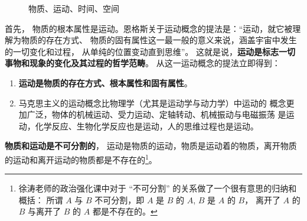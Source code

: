 \documentclass[10pt, UTF8]{book} %
\begin{document}
\begin{figure}[H]
\caption{物质、运动、时间、空间}
\end{figure}

首先，
物质的根本属性是运动。恩格斯关于运动概念的提法是：“运动，就它被理解为物质的存在方式、
物质的固有属性这一最一般的意义来说，涵盖宇宙中发生的一切变化和过程，
从单纯的位置变动直到思维”。
这就是说，\textbf{运动是标志一切事物和现象的变化及其过程的哲学范畴}。
从这一运动概念的提法立即得到：
\begin{enumerate}[label={${\arabic*}^\circ$}, itemsep=0pt]
    \item \textbf{运动是物质的存在方式、根本属性和固有属性}。
    \item 马克思主义的运动概念比物理学（尤其是运动学与动力学）中运动的
    概念更加广泛，物体的机械运动、受力运动、定轴转动、机械振动与电磁振荡
    是运动，化学反应、生物化学反应也是运动，人的思维过程也是运动。
\end{enumerate}
\textbf{物质和运动是不可分割的}，
运动是物质的运动，物质是运动着的物质，离开物质的运动和离开运动的物质都是不存在的\footnote{
    徐涛老师的政治强化课中对于 “不可分割” 的关系做了一个很有意思的归纳和概括：
    所谓 $A$ 与 $B$ 不可分割，即 $A$ 是 $B$ 的 $A$, $B$ 是 $A$ 的 $B$，
    离开了 $A$ 的 $B$ 与离开了 $B$ 的 $A$ 都是不存在的。
}。



\end{document}
